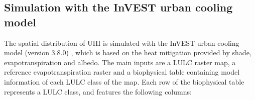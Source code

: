 \documentclass[12pt]{iopart}
\begin{document}








\subsection{Simulation with the InVEST urban cooling model}

The spatial distribution of UHI is simulated with the InVEST urban cooling model (version 3.8.0) \cite{sharp2020invest}, which is based on the heat mitigation provided by shade, evapotranspiration and albedo. The main inputs are a LULC raster map, a reference evapotranspiration raster and a biophysical table containing model information of each LULC class of the map. Each row of the biophysical table represents a LULC class, and features the following columns:
\end{document}
